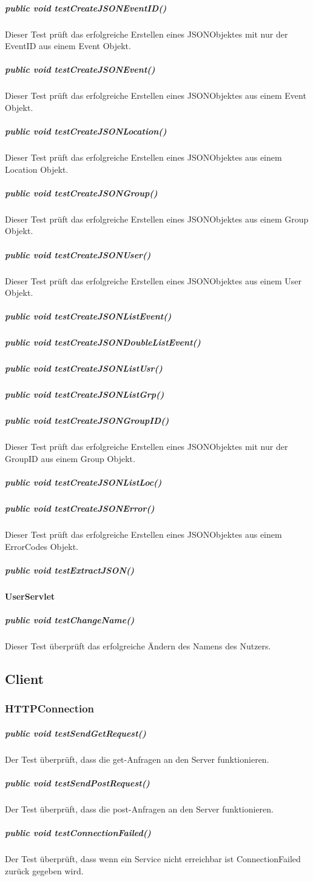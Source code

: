 \documentclass{scrartcl}
\begin{document}
	\subparagraph{public void testCreateJSONEventID()}
	Dieser Test prüft das erfolgreiche Erstellen eines JSONObjektes mit nur der EventID aus einem Event Objekt.
	\subparagraph{public void testCreateJSONEvent()}
	Dieser Test prüft das erfolgreiche Erstellen eines JSONObjektes aus einem Event Objekt.
	\subparagraph{public void testCreateJSONLocation()}
	Dieser Test prüft das erfolgreiche Erstellen eines JSONObjektes aus einem Location Objekt.
	\subparagraph{public void testCreateJSONGroup()}
	Dieser Test prüft das erfolgreiche Erstellen eines JSONObjektes aus einem Group Objekt.	
	\subparagraph{public void testCreateJSONUser()}
	Dieser Test prüft das erfolgreiche Erstellen eines JSONObjektes aus einem User Objekt.	
	\subparagraph{public void testCreateJSONListEvent()}
	
	\subparagraph{public void testCreateJSONDoubleListEvent()}
	
	\subparagraph{public void testCreateJSONListUsr()}
	
	\subparagraph{public void testCreateJSONListGrp()}
	
	\subparagraph{public void testCreateJSONGroupID()}
	Dieser Test prüft das erfolgreiche Erstellen eines JSONObjektes mit nur der GroupID aus einem Group Objekt.	
	\subparagraph{public void testCreateJSONListLoc()}
	
	\subparagraph{public void testCreateJSONError() }
	Dieser Test prüft das erfolgreiche Erstellen eines JSONObjektes aus einem ErrorCodes Objekt.
	
	\subparagraph{public void testExtractJSON()}

	\paragraph{UserServlet}	
	\subparagraph{public void testChangeName()}
	Dieser Test überprüft das erfolgreiche Ändern des Namens des Nutzers.
	
	\subsection{Client}
	\subsubsection{HTTPConnection}
	\subparagraph{public void testSendGetRequest()}	
	Der Test überprüft, dass die get-Anfragen an den Server funktionieren.
	\subparagraph{public void testSendPostRequest()}
	Der Test überprüft, dass die post-Anfragen an den Server funktionieren.
	\subparagraph{public void testConnectionFailed()}
	Der Test überprüft, dass wenn ein Service nicht erreichbar ist ConnectionFailed zurück gegeben wird.
\end{document}
